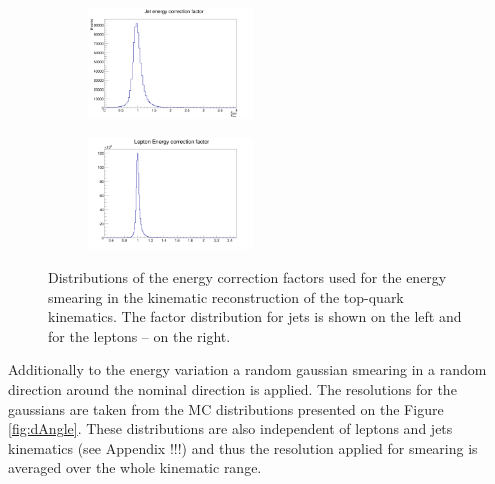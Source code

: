 \begin{figure}[t]
\centering
\begin{subfigure}
  \centering
  \includegraphics[width=0.48\textwidth]{05_kinReco/plots/fE_jet.png}
\end{subfigure}
\begin{subfigure}
  \centering
  \includegraphics[width=0.48\textwidth]{05_kinReco/plots/fE_lep.png}
\end{subfigure}
\caption{Distributions of the energy correction factors used for the energy smearing in the kinematic
reconstruction of the top-quark kinematics. The factor distribution for jets is shown on the left and for
the leptons -- on the right.}
\label{fig:fE}
\end{figure}

Additionally to the energy variation a random gaussian smearing in a random direction around the nominal direction is applied. The resolutions for
the gaussians are taken from the MC distributions presented on the Figure \ref{fig:dAngle}. These distributions are also independent of leptons and
jets kinematics (see Appendix !!!) and thus the resolution applied for smearing is averaged over the whole kinematic range.

